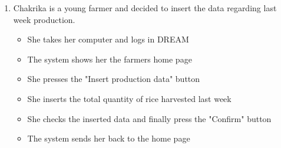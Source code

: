 \documentclass[table, 12pt]{article}
\begin{document}
\begin{enumerate}
    \item Chakrika is a young farmer and decided to insert the data regarding last week production.
    \begin{itemize}
        \item She takes her computer and logs in DREAM
        \item The system shows her the farmers home page
        \item She presses the "Insert production data" button
        \item She inserts the total quantity of rice harvested last week 
        \item She checks the inserted data and finally press the "Confirm" button 
        \item The system sends her back to the home page
    \end{itemize}


\end{enumerate}
\end{document}
